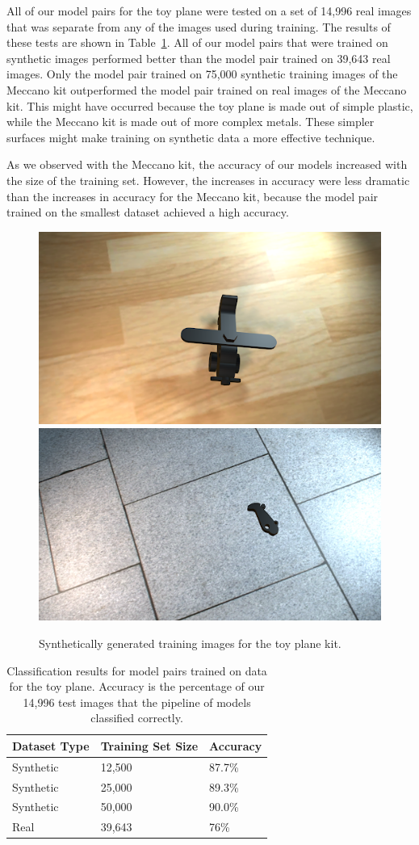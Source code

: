 All of our model pairs for the toy plane were tested on a set of 14,996 real
images that was separate from any of the images used during training.
The results of these tests are shown in Table~\ref{tab:plane_accuracy}.
All of our model pairs that were trained on synthetic images performed better
than the model pair trained on 39,643 real images.
Only the model pair trained on 75,000 synthetic training images of the Meccano
kit outperformed the model pair trained on real images of the Meccano kit.
This might have occurred because the toy plane is made out of simple plastic,
while the Meccano kit is made out of more complex metals.
These simpler surfaces might make training on synthetic data a more effective
technique.

As we observed with the Meccano kit, the accuracy of our models increased with
the size of the training set.
However, the increases in accuracy were less dramatic than the increases in
accuracy for the Meccano kit, because the model pair trained on the smallest
dataset achieved a high accuracy.

\begin{figure}
  \includegraphics[width=0.5\columnwidth]{figures/synthetic/plane_train1.png}
  \includegraphics[width=0.5\columnwidth]{figures/synthetic/plane_train2.png}
  \caption{
    Synthetically generated training images for the toy plane kit.
  }\label{fig:plane_train}
\end{figure}

\begin{table}
\begin{tabular}{|l||l|l|}
\hline
  Dataset Type & Training Set Size & Accuracy\\
  \hline
  \hline
  Synthetic & 12,500 & 87.7\%\\
  Synthetic & 25,000 & 89.3\%\\
  Synthetic & 50,000 & 90.0\%\\
  \hline
  Real & 39,643 & 76\%\\
\hline
\end{tabular}
  \caption{
    Classification results for model pairs trained on data for the toy plane.
    Accuracy is the percentage of our 14,996 test images that the pipeline of
    models classified correctly.
  }\label{tab:plane_accuracy}
\end{table}


